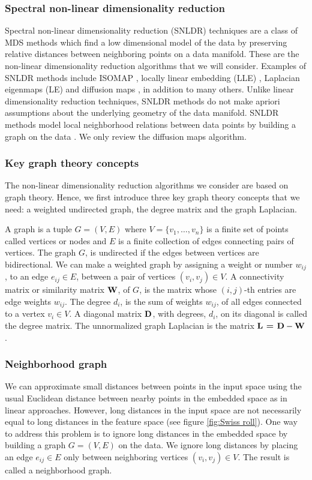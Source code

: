 \subsubsection{Spectral non-linear dimensionality reduction}
Spectral non-linear dimensionality reduction (SNLDR) techniques are a 
class of MDS methods which find a low dimensional model of the data by preserving relative distances between neighboring points on a data manifold. These are the non-linear dimensionality reduction algorithms that we will consider. Examples of SNLDR methods include ISOMAP \cite{TenenbaumJB2000Aggf}, locally linear embedding (LLE)  \cite{roweis2000nonlinear}, Laplacian eigenmaps (LE) \cite{belkin2003laplacian} and diffusion maps \cite{coifman2006diffusion}, in addition to many others. Unlike linear dimensionality reduction techniques, SNLDR methods do not make apriori assumptions about the underlying geometry of the data manifold. SNLDR methods model local neighborhood relations between data points by building a graph on the data  \cite{Luxburg2007}. We only review the diffusion maps algorithm.


\subsubsection{Key graph theory concepts}
The non-linear dimensionality reduction algorithms we consider are based on graph theory. Hence, we first introduce three key graph theory concepts that we need: a weighted undirected graph, the degree matrix and the graph Laplacian.


A graph is a tuple $G = (V,E)$ where $V = \{v_1, \ldots , v_n\}$ is a finite set of points called vertices or nodes and $E$ is a finite collection of edges connecting pairs of vertices. The graph $G$, is undirected if the edges between vertices are bidirectional.
We can make a weighted graph by assigning a weight or number $w_{ij}$, to an edge $e_{ij} \in E$, between a pair of vertices $(v_i, v_j) \in V$. A connectivity matrix or similarity matrix $\textbf{W}$, of $G$, is the matrix whose $(i,j)$-th entries are edge weights $w_{ij}$.
The degree $d_i$, is the sum of weights $w_{ij}$, of all edges connected to a vertex $v_i \in V$.
A diagonal matrix $\textbf{D}$, with degrees, $d_{i}$, on its diagonal is called the degree matrix.
The unnormalized graph Laplacian is the  matrix $\textbf{L = D} - \textbf{W}$.


\subsubsection{Neighborhood graph}
We can approximate small distances between points in the input space using the usual Euclidean distance between nearby points in the embedded space as in linear approaches. However, long distances in the input space are not necessarily equal to long distances in the feature space (see figure \ref{fig:Swiss roll}). One way to address this problem is to ignore long distances in the embedded space by building a graph $G = (V, E)$ on the data. We ignore long distances by placing an edge $e_{ij} \in E$ only between neighboring vertices $(v_i, v_j) \in V$. The result is called 
a neighborhood graph.



